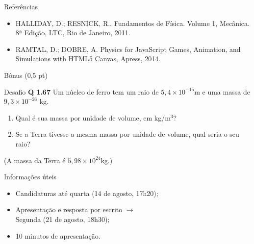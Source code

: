 \documentclass[xcolor=dvipsnames,table]{beamer}
\begin{document}
	\begin{frame}{Referências}
		\begin{itemize}
			\item HALLIDAY, D.; RESNICK, R.. Fundamentos de Física. Volume 1, Mecânica. 8ª Edição, LTC, Rio de Janeiro, 2011.
			
			\item RAMTAL, D.; DOBRE, A. Physics for JavaScript Games, Animation, and Simulations with HTML5 Canvas, Apress, 2014.
		\end{itemize}
	\end{frame}
	
	\begin{frame}{Bônus (0,5 pt)}
		\begin{block}{Desafio}
			{\bf Q 1.67} Um núcleo de ferro tem um raio de $5,4 \times 10^{-15}$m e uma massa de $9,3 \times 10^{-26}$ kg.
			\begin{enumerate}
				\item Qual é sua massa por unidade de volume, em kg/m$^3$?
				\item Se a Terra tivesse a mesma massa por unidade de volume, qual seria o seu raio?
			\end{enumerate}
			(A massa da Terra é $5,98 \times 10^{24}$kg.) 
		\end{block} \pause
		\begin{block}{Informações úteis}
			\begin{itemize}
                \item Candidaturas até quarta (14 de agosto, 17h20);
                \item Apresentação e resposta por escrito $\rightarrow$ \\Segunda (21 de agosto, 18h30);
                \item 10 minutos de apresentação.
			\end{itemize}
		\end{block} 
	\end{frame}
	
	\begin{frame}
		\titlepage
	\end{frame}
	
\end{document}

